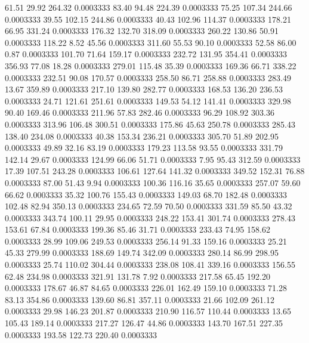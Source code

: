   61.51   29.92  264.32   0.0003333
  83.40   94.48  224.39   0.0003333
  75.25  107.34  244.66   0.0003333
  39.55  102.15  244.86   0.0003333
  40.43  102.96  114.37   0.0003333
 178.21   66.95  331.24   0.0003333
 176.32  132.70  318.09   0.0003333
 260.22  130.86   50.91   0.0003333
 118.22    8.52   45.56   0.0003333
 311.60   55.53   90.10   0.0003333
  52.58   86.00    0.87   0.0003333
 101.70   71.64  159.17   0.0003333
 232.72  131.95  354.41   0.0003333
 356.93   77.08   18.28   0.0003333
 279.01  115.48   35.39   0.0003333
 169.36   66.71  338.22   0.0003333
 232.51   90.08  170.57   0.0003333
 258.50   86.71  258.88   0.0003333
 283.49   13.67  359.89   0.0003333
 217.10  139.80  282.77   0.0003333
 168.53  136.20  236.53   0.0003333
  24.71  121.61  251.61   0.0003333
 149.53   54.12  141.41   0.0003333
 329.98   90.40  169.46   0.0003333
 211.96   57.83  282.46   0.0003333
  96.29  108.92  303.36   0.0003333
 313.96  106.48  300.51   0.0003333
 175.86   45.63  250.78   0.0003333
 285.43  138.40  234.08   0.0003333
  40.38  153.34  236.21   0.0003333
 305.70   51.89  202.95   0.0003333
  49.89   32.16   83.19   0.0003333
 179.23  113.58   93.55   0.0003333
 331.79  142.14   29.67   0.0003333
 124.99   66.06   51.71   0.0003333
   7.95   95.43  312.59   0.0003333
  17.39  107.51  243.28   0.0003333
 106.61  127.64  141.32   0.0003333
 349.52  152.31   76.88   0.0003333
  87.00   51.43    9.94   0.0003333
 100.36  116.16   35.65   0.0003333
 257.07   59.60   66.62   0.0003333
  35.32  100.76  155.43   0.0003333
 149.03   68.70  182.48   0.0003333
 102.48   82.94  350.13   0.0003333
 234.65   72.59   70.50   0.0003333
 331.59   85.50   43.32   0.0003333
 343.74  100.11   29.95   0.0003333
 248.22  153.41  301.74   0.0003333
 278.43  153.61   67.84   0.0003333
 199.36   85.46   31.71   0.0003333
 233.43   74.95  158.62   0.0003333
  28.99  109.06  249.53   0.0003333
 256.14   91.33  159.16   0.0003333
  25.21   45.33  279.99   0.0003333
 188.69  149.74  342.09   0.0003333
 280.14   86.99  298.95   0.0003333
  25.74  110.02  304.44   0.0003333
 238.08  108.41  339.16   0.0003333
 156.55   62.48  234.98   0.0003333
 321.91  131.78    7.92   0.0003333
 217.58   65.45  192.20   0.0003333
 178.67   46.87   84.65   0.0003333
 226.01  162.49  159.10   0.0003333
  71.28   83.13  354.86   0.0003333
 139.60   86.81  357.11   0.0003333
  21.66  102.09  261.12   0.0003333
  29.98  146.23  201.87   0.0003333
 210.90  116.57  110.44   0.0003333
  13.65  105.43  189.14   0.0003333
 217.27  126.47   44.86   0.0003333
 143.70  167.51  227.35   0.0003333
 193.58  122.73  220.40   0.0003333
